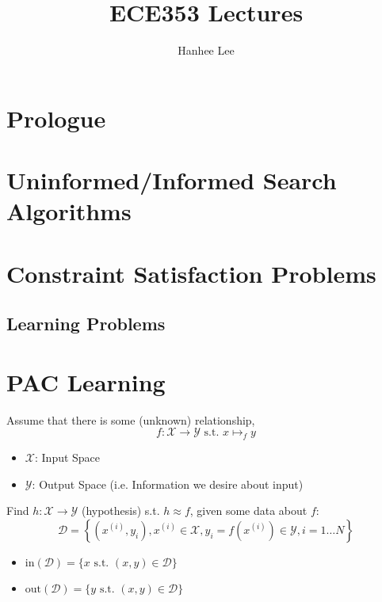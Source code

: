 \documentclass{article}
\title{ECE353 Lectures}
\author{Hanhee Lee}
\begin{document}
\maketitle

\tableofcontents
\newpage

\section{Prologue}

\newpage

\section{Uninformed/Informed Search Algorithms}

\newpage

\section{Constraint Satisfaction Problems}

\newpage

\begin{center}
    \section*{Learning Problems}
\end{center}

\section{PAC Learning}
\begin{definition}
    Assume that there is some (unknown) relationship, 
    \begin{equation*}
        f: \mathcal{X} \rightarrow \mathcal{Y} \text{ s.t. } x \mapsto_f y
    \end{equation*}
    \begin{itemize}
        \item $\mathcal{X}$: Input Space
        \item $\mathcal{Y}$: Output Space (i.e. Information we desire about input)
    \end{itemize}
    \vspace{1em}

    Find $h: \mathcal{X} \rightarrow \mathcal{Y}$ (hypothesis) s.t. $h \approx f$, given some data about $f$: 
    \begin{equation*}
        \mathcal{D} = \left\{ \left(x^{(i)}, y_i\right), x^{(i)} \in \mathcal{X}, y_i = f\left(x^{(i)}\right) \in \mathcal{Y}, i = 1 \ldots N \right\}
    \end{equation*}

    \begin{itemize}
        \item $\text{in}(\mathcal{D}) = \{x \text{ s.t. } (x,y) \in \mathcal{D}\}$
        \item $\text{out}(\mathcal{D}) = \{y \text{ s.t. } (x,y) \in \mathcal{D}\}$
    \end{itemize}
\end{definition}
\end{document}

